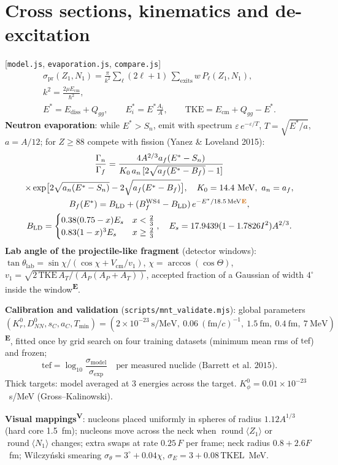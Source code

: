 \documentclass[11pt,a4paper]{article}
\newcommand{\file}[1]{\texttt{\small #1}}
\newcommand{\src}[1]{\hfill{\small\color{gray}[#1]}}
\newcommand{\emp}{\textsuperscript{\color{orange!80!black}\textbf{E}}}
\newcommand{\vis}{\textsuperscript{\color{blue!70!black}\textbf{V}}}
\begin{document}
\section{Cross sections, kinematics and de-excitation}
\src{\file{model.js}, \file{evaporation.js}, \file{compare.js}}
\begin{gather}
\sigma_\text{pr}(Z_1,N_1) = \frac{\pi}{k^2}\sum_\ell(2\ell+1)\,\sum_\text{exits}w\,P_\ell(Z_1,N_1),\\
k^2 = \frac{2\mu E_\text{cm}}{\hbar^2},\\
E^* = E_\text{diss}+Q_{gg},\qquad E_i^* = E^*\frac{A_i}{A},\qquad \text{TKE} = E_\text{cm}+Q_{gg}-E^* .
\end{gather}
\textbf{Neutron evaporation}: while $E^*>S_n$, emit with spectrum $\varepsilon\,e^{-\varepsilon/T}$, $T=\sqrt{E^*/a}$, $a=A/12$;
for $Z\ge88$ compete with fission (Yanez \& Loveland 2015):
\begin{gather}
\frac{\Gamma_n}{\Gamma_f} = \frac{4A^{2/3}a_f(E^*-S_n)}{K_0\,a_n\,[2\sqrt{a_f(E^*-B_f)}-1]}\\
\times\exp\!\big[2\sqrt{a_n(E^*-S_n)}-2\sqrt{a_f(E^*-B_f)}\big],\quad K_0 = 14.4~\text{MeV},\ a_n=a_f,\\
B_f(E^*) = B_\text{LD} + (B_f^\text{WS4}-B_\text{LD})\,e^{-E^*/18.5\,\text{MeV}}\emp,\\
B_\text{LD} = \begin{cases}0.38(0.75-x)E_s & x<\tfrac23\\ 0.83(1-x)^3E_s & x\ge\tfrac23\end{cases},\quad
E_s = 17.9439(1-1.7826I^2)A^{2/3}.
\end{gather}
\textbf{Lab angle of the projectile-like fragment} (detector windows):
$\tan\theta_\text{lab} = \sin\chi/(\cos\chi+V_\text{cm}/v_1)$, $\chi=\arccos(\cos\Theta)$,
$v_1 = \sqrt{2\,\text{TKE}\,A_T/(A_P(A_P+A_T))}$, accepted fraction of a Gaussian of width $4^\circ$ inside the window\emp.

\textbf{Calibration and validation} (\file{scripts/mnt\_validate.mjs}): global parameters
$(K_r^0, D_{NN}^0, s_C, a_C, T_\text{min}) = (2\times10^{-23}~\text{s/MeV},\ 0.06~(\text{fm}/c)^{-1},\ 1.5~\text{fm},\ 0.4~\text{fm},\ 7~\text{MeV})$\emp,
fitted once by grid search on four training datasets (minimum mean rms of $\text{tef}$) and frozen;
\begin{equation}
\text{tef} = \log_{10}\frac{\sigma_\text{model}}{\sigma_\text{exp}}\quad\text{per measured nuclide (Barrett et al.\ 2015).}
\end{equation}
Thick targets: model averaged at 3 energies across the target. $K_\phi^0 = 0.01\times10^{-23}$~s/MeV (Gross--Kalinowski).

\textbf{Visual mappings}\vis: nucleons placed uniformly in spheres of radius $1.12A^{1/3}$ (hard core 1.5~fm);
nucleons move across the neck when $\operatorname{round}\langle Z_1\rangle$ or $\operatorname{round}\langle N_1\rangle$ changes; extra swaps at
rate $0.25\,F$ per frame; neck radius $0.8+2.6F$~fm; Wilczyński smearing $\sigma_\theta = 3^\circ+0.04\chi$, $\sigma_E = 3+0.08\,\text{TKEL}$~MeV.
\end{document}
